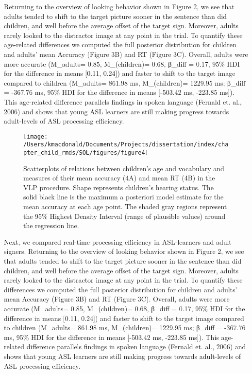 \documentclass[oneside]{report}
\begin{document}
Returning to the overview of looking behavior shown in Figure 2, we see
that adults tended to shift to the target picture sooner in the sentence
than did children, and well before the average offset of the target
sign. Moreover, adults rarely looked to the distractor image at any
point in the trial. To quantify these age-related differences we
computed the full posterior distribution for children and adults' mean
Accuracy (Figure 3B) and RT (Figure 3C). Overall, adults were more
accurate (M\_adults= 0.85, M\_(children)= 0.68, β\_diff = 0.17, 95\% HDI
for the difference in means {[}0.11, 0.24{]}) and faster to shift to the
target image compared to children (M\_adults= 861.98 ms, M\_(children)=
1229.95 ms; β\_diff = -367.76 ms, 95\% HDI for the difference in means
{[}-503.42 ms, -223.85 ms{]}). This age-related difference parallels
findings in spoken language (Fernald et. al., 2006) and shows that young
ASL learners are still making progress towards adult-levels of ASL
processing efficiency.
\begin{figure}[t]

{\centering \texttt{[image: /Users/kmacdonald/Documents/Projects/dissertation/index/chapter\_child\_rmds/SOL/figures/figure4]} 

}

\caption[Scatterplots of relations between children's age and vocabulary and ASL processing]{Scatterplots of relations between children's age and vocabulary and measures of their mean accuracy (4A) and mean RT (4B) in the VLP procedure. Shape represents children's hearing status. The solid black line is the maximum a posteriori model estimate for the mean accuracy at each age point. The shaded gray regions represent the 95\% Highest Density Interval (range of plausible values) around the regression line.}\label{fig:sol-corr-figure}
\end{figure}
Next, we compared real-time processing efficiency in ASL-learners and
adult signers. Returning to the overview of looking behavior shown in
Figure 2, we see that adults tended to shift to the target picture
sooner in the sentence than did children, and well before the average
offset of the target sign. Moreover, adults rarely looked to the
distractor image at any point in the trial. To quantify these
differences we computed the full posterior distribution for children and
adults' mean Accuracy (Figure 3B) and RT (Figure 3C). Overall, adults
were more accurate (M\_adults= 0.85, M\_(children)= 0.68, β\_diff =
0.17, 95\% HDI for the difference in means {[}0.11, 0.24{]}) and faster
to shift to the target image compared to children (M\_adults= 861.98 ms,
M\_(children)= 1229.95 ms; β\_diff = -367.76 ms, 95\% HDI for the
difference in means {[}-503.42 ms, -223.85 ms{]}). This age-related
difference parallels findings in spoken language (Fernald et. al., 2006)
and shows that young ASL learners are still making progress towards
adult-levels of ASL processing efficiency.
\end{document}
